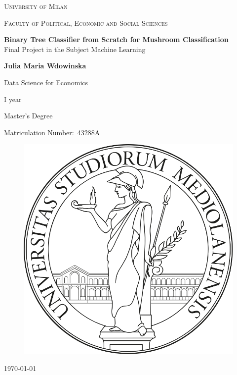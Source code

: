 \documentclass{article}
\author{Julia Maria Wdowinska}
\date{} %
\begin{document}
\begin{titlepage}
    \centering
    \vfill
    {\scshape\Large University of Milan \par}
    \vspace{0.5cm}
    {\scshape\large Faculty of Political, Economic and Social Sciences \par}
    \vspace{3cm}
    {\huge
    \textbf{Binary Tree Classifier from Scratch for Mushroom Classification} \\
    \vspace{0.5cm}
    \large Final Project in the Subject Machine Learning \par}
    \vspace{2cm}
    {\large \textbf{Julia Maria Wdowinska} \par}
    \vspace{0.5cm}
    {\large Data Science for Economics \par}
    {\large I year\par}
    {\large Master’s Degree \par}
    {\large Matriculation Number:\ 43288A \par}
\vfill
\begin{center}
\begin{figure}[h!]\centering
 \includegraphics[keepaspectratio=true,scale=0.2]{logo} \\
\end{figure}
\end{center}
\vfill
    {\large \today \par}
    \vfill
\end{titlepage}
\end{document}
